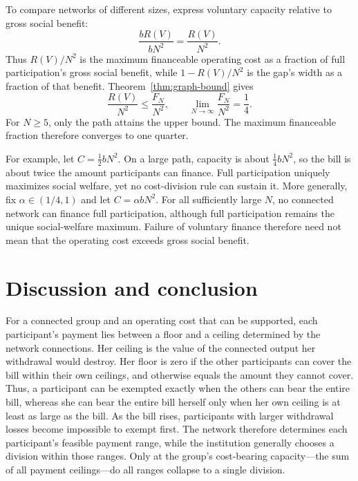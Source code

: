 \documentclass[preprint,12pt,authoryear]{elsarticle}
\begin{document}
To compare networks of different sizes, express voluntary capacity relative to
gross social benefit:
\[
 \frac{bR(V)}{bN^2}=\frac{R(V)}{N^2}.
\]
Thus \(R(V)/N^2\) is the maximum financeable operating cost as a fraction of
full participation's gross social benefit, while \(1-R(V)/N^2\) is the gap's
width as a fraction of that benefit. Theorem~\ref{thm:graph-bound} gives
\[
 \frac{R(V)}{N^2}\leq\frac{F_N}{N^2},
 \qquad
 \lim_{N\to\infty}\frac{F_N}{N^2}=\frac14.
\]
For \(N\geq5\), only the path attains the upper bound. The maximum financeable
fraction therefore converges to one quarter.

For example, let \(C=\tfrac12 bN^2\). On a large path, capacity is about
\(\tfrac14 bN^2\), so the bill is about twice the amount participants can
finance. Full participation uniquely maximizes social welfare, yet no
cost-division rule can sustain it. More generally, fix
\(\alpha\in(1/4,1)\) and let \(C=\alpha bN^2\). For all sufficiently large
\(N\), no connected network can finance full participation, although full
participation remains the unique social-welfare maximum. Failure of voluntary
finance therefore need not mean that the operating cost exceeds gross social
benefit.

\section{Discussion and conclusion}
\label{sec:discussion}

For a connected group and an operating cost that can be supported, each participant's payment lies
between a floor and a ceiling determined by the network connections. Her ceiling is the
value of the connected output her withdrawal would destroy. Her floor is zero
if the other participants can cover the bill within their own ceilings, and
otherwise equals the amount they cannot cover. Thus, a participant can be
exempted exactly when the others can bear the entire bill, whereas she can bear
the entire bill herself only when her own ceiling is at least as large as the
bill. As the bill rises, participants with larger withdrawal losses become
impossible to exempt first. The network therefore determines each
participant's feasible payment range, while the institution generally chooses
a division within those ranges. Only at the group's cost-bearing
capacity---the sum of all payment ceilings---do all ranges collapse to a
single division.
\end{document}
